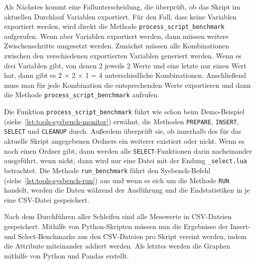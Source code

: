 Als Nächstes kommt eine Fallunterscheidung, die überprüft, ob das Skript im aktuellen Durchlauf Variablen exportiert.
Für den Fall, dass keine Variablen exportiert werden, wird direkt die Methode \texttt{process\_script\_benchmark} aufgerufen.
Wenn aber Variablen exportiert werden, dann müssen weitere Zwischenschritte umgesetzt werden.
Zunächst müssen alle Kombinationen zwischen den verschiedenen exportierten Variablen generiert werden.
Wenn es drei Variablen gibt, von denen 2 jeweils 2 Werte und eine letzte nur einen Wert hat, dann gibt es 2 × 2 × 1 = 4 unterschiedliche Kombinationen.
Anschließend muss man für jede Kombination die entsprechenden Werte exportieren und dann die Methode \texttt{process\_script\_benchmark} aufrufen.

Die Funktion \texttt{process\_script\_benchmark} führt wie schon beim Demo-Beispiel (siehe~\ref{lst:tools-sysbench-monitor}) erwähnt, die Methoden \texttt{PREPARE}, \texttt{INSERT}, \texttt{SELECT} und \texttt{CLEANUP} durch.
Außerdem überprüft sie, ob innerhalb des für das aktuelle Skript angegebenen Ordners ein weiterer existiert oder nicht.
Wenn es noch einen Ordner gibt, dann werden alle \texttt{SELECT}-Funktionen darin nacheinander ausgeführt, wenn nicht, dann wird nur eine Datei mit der Endung \texttt{\_select.lua} betrachtet.
Die Methode \texttt{run\_benchmark} führt den Sysbench-Befehl (siehe~\ref{lst:tools-sysbench-run}) aus und wenn es sich um die Methode \texttt{RUN} handelt, werden die Daten während der Ausführung und die Endstatistiken in je eine CSV-Datei gespeichert.

\vspace{-8pt}

\vspace{-5pt}

Nach dem Durchführen aller Schleifen sind alle Messwerte in CSV-Dateien gespeichert.
Mithilfe von Python-Skripten müssen nun die Ergebnisse der Insert- und Select-Benchmarks aus den CSV-Dateien pro Skript vereint werden, indem die Attribute miteinander addiert werden.
Als letztes werden die Graphen mithilfe von Python und Pandas erstellt.
%

